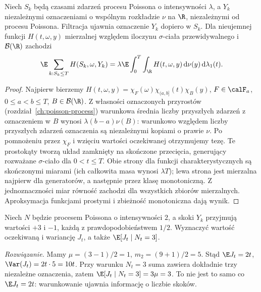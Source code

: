 \begin{twierdzenie}
\label{thm:marked-poisson-compensation}
Niech $S_k$ będą czasami zdarzeń procesu Poissona
o intensywności $\lambda$, a $Y_k$ niezależnymi
oznaczeniami o wspólnym rozkładzie $\nu$ na $\R$,
niezależnymi od procesu Poissona. Filtracja
ujawnia oznaczenie $Y_k$ dopiero w $S_k$.
Dla nieujemnej funkcji $H(t,\omega,y)$
mierzalnej względem iloczynu $\sigma$-ciała
przewidywalnego i $\mathcal B(\R)$ zachodzi
\[
\E\sum_{k:S_k\le T}H(S_k,\omega,Y_k)
=\lambda\E\int_0^T\int_{\R}H(t,\omega,y)
\,\mathrm d\nu(y)\,\mathrm d\lambda_1(t).
\]
\end{twierdzenie}
\begin{proof}
Najpierw bierzemy
$H(t,\omega,y)=\chi_F(\omega)\chi_{(a,b]}(t)
\chi_B(y)$, $F\in\calF_a$, $0\le a<b\le T$,
$B\in\mathcal B(\R)$.
Z własności oznaczonych przyrostów
(rozdział~\ref{ch:poisson-process})
warunkowa średnia liczby przyszłych zdarzeń
z oznaczeniem w $B$ wynosi
$\lambda(b-a)\nu(B)$: warunkowo względem
liczby przyszłych zdarzeń oznaczenia są
niezależnymi kopiami o prawie $\nu$.
Po pomnożeniu przez $\chi_F$ i wzięciu
wartości oczekiwanej otrzymujemy tezę.
Te prostokąty tworzą układ zamknięty na
skończone przecięcia, generujący rozważane
$\sigma$-ciało dla $0<t\le T$.
Obie strony dla funkcji charakterystycznych
są skończonymi miarami (ich całkowita masa
wynosi $\lambda T$); lewa strona jest
mierzalna najpierw dla generatorów,
a następnie przez klasę monotoniczną.
Z jednoznaczności miar równość zachodzi
dla wszystkich zbiorów mierzalnych.
Aproksymacja funkcjami prostymi i zbieżność
monotoniczna dają wynik.
\end{proof}

\begin{zadanie}
Niech $N$ będzie procesem Poissona o intensywności $2$,
a skoki $Y_k$ przyjmują wartości $+3$ i $-1$,
każdą z prawdopodobieństwem $1/2$.
Wyznaczyć wartość oczekiwaną i wariancję $J_t$,
a także $\E[J_t\mid N_t=3]$.

\emph{Rozwiązanie.} Mamy
$\mu=(3-1)/2=1$, $m_2=(9+1)/2=5$.
Stąd $\E J_t=2t$, $\Var(J_t)=2t\cdot5=10t$.
Przy warunku $N_t=3$ suma zawiera dokładnie
trzy niezależne oznaczenia, zatem
$\E[J_t\mid N_t=3]=3\mu=3$.
To nie jest to samo co $\E J_t=2t$:
warunkowanie ujawnia informację o liczbie skoków.
\end{zadanie}


